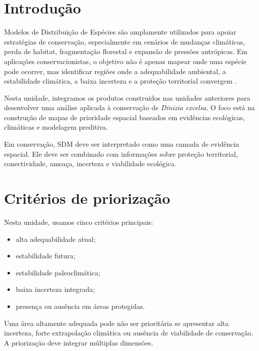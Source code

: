\documentclass{ueap-sdm}
\begin{document}
\section{Introdução}

Modelos de Distribuição de Espécies são amplamente utilizados para apoiar estratégias de conservação, especialmente em cenários de mudanças climáticas, perda de habitat, fragmentação florestal e expansão de pressões antrópicas. Em aplicações conservacionistas, o objetivo não é apenas mapear onde uma espécie pode ocorrer, mas identificar regiões onde a adequabilidade ambiental, a estabilidade climática, a baixa incerteza e a proteção territorial convergem \parencite{margules2000systematic,moilanen2009spatial,franklin2023,guisan2017habitat,zurell2020benchmarking}.

Nesta unidade, integramos os produtos construídos nas unidades anteriores para desenvolver uma análise aplicada à conservação de \textit{Dinizia excelsa}. O foco está na construção de mapas de prioridade espacial baseados em evidências ecológicas, climáticas e modelagem preditiva.

\begin{conceito}[title={\faBook\quad SDM aplicado à conservação}]
	Em conservação, SDM deve ser interpretado como uma camada de evidência espacial. Ele deve ser combinado com informações sobre proteção territorial, conectividade, ameaça, incerteza e viabilidade ecológica.
\end{conceito}

\section{Critérios de priorização}

Nesta unidade, usamos cinco critérios principais:

\begin{itemize}
	\item alta adequabilidade atual;
	\item estabilidade futura;
	\item estabilidade paleoclimática;
	\item baixa incerteza integrada;
	\item presença ou ausência em áreas protegidas.
\end{itemize}

\begin{atencao}[title={\faExclamationTriangle\quad Prioridade não é apenas adequabilidade}]
	Uma área altamente adequada pode não ser prioritária se apresentar alta incerteza, forte extrapolação climática ou ausência de viabilidade de conservação. A priorização deve integrar múltiplas dimensões.
\end{atencao}
\end{document}
